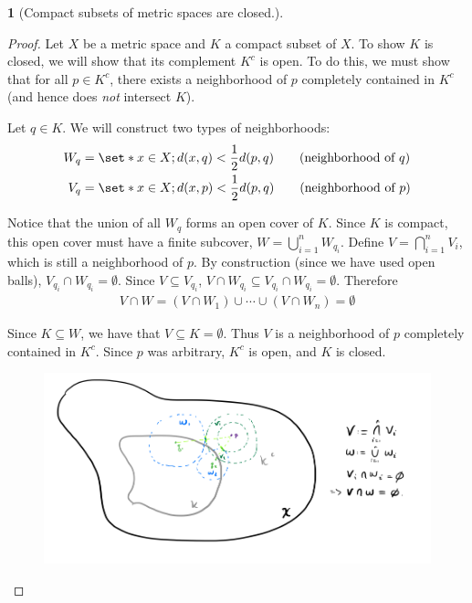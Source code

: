 \documentclass[11pt]{article}
\numberwithin{equation}{section}
\theoremstyle{plain}
\newtheorem{theorem}{\color{ForestGreen}{\textbf{Theorem}}}[section]
\theoremstyle{definition}
\def\Set{\set*}%
\newcommand{\1}{\mathbbm 1}
\begin{document}
\begin{theorem}[Compact subsets of metric spaces are closed.]
\end{theorem}
\begin{proof}
	Let $X$ be a metric space and $K$ a compact subset of $X$. To show $K$ is closed, we will show that its complement $K^c$ is open. To do this, we must show that for all $p \in K^c$, there exists a neighborhood of $p$ completely contained in $K^c$ (and hence does \emph{not} intersect $K$). 

	Let $q \in K$. We will construct two types of neighborhoods:
	\begin{align*}
		W_q &= \Set{x \in X; d(x,q) < \frac{1}{2} d(p,q)} \tag{neighborhood of $q$} \\
		V_q &= \Set{x \in X; d(x,p) < \frac{1}{2} d(p,q)} \tag{neighborhood of $p$}
	\end{align*}
	
	Notice that the union of all $W_q$ forms an open cover of $K$. Since $K$ is compact, this open cover must have a finite subcover, $W = \bigcup_{i=1}^n W_{q_i}$. Define $V = \bigcap_{i=1}^n V_i$, which is still a neighborhood of $p$. By construction (since we have used open balls), $V_{q_i} \cap W_{q_i} = \emptyset$. Since $V \subseteq V_{q_i}$, $V \cap W_{q_i} \subseteq V_{q_i} \cap W_{q_i} = \emptyset$.  Therefore
	\begin{align*}
		V \cap W = (V \cap W_1) \cup \cdots \cup (V \cap W_n) = \emptyset
	\end{align*}
	
	Since $K \subseteq W$, we have that $V \subseteq K = \emptyset$. Thus $V$ is a neighborhood of $p$ completely contained in $K^c$. Since $p$ was arbitrary, $K^c$ is open, and $K$ is closed. 
	
	
	\begin{figure}[H]
		\begin{center}
			\includegraphics[scale=.45]{compact_closed.png}
		\end{center}
	\end{figure}
\end{proof}
\end{document}
